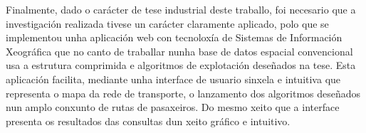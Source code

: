 Finalmente, dado o car\'acter de tese industrial deste traballo, foi necesario que a investigaci\'on realizada tivese un car\'acter claramente aplicado, polo que se implementou unha aplicaci\'on web con tecnolox\'ia de Sistemas de Informaci\'on Xeogr\'afica que no canto de traballar nunha base de datos espacial convencional usa a estrutura comprimida e algoritmos de explotaci\'on dese\~nados na tese. Esta aplicaci\'on facilita, mediante unha interface de usuario sinxela e intuitiva que representa o mapa da rede de transporte, o lanzamento dos algoritmos dese\~nados nun amplo conxunto de rutas de pasaxeiros. Do mesmo xeito que a interface presenta os resultados das consultas dun xeito gr\'afico e intuitivo.
 


